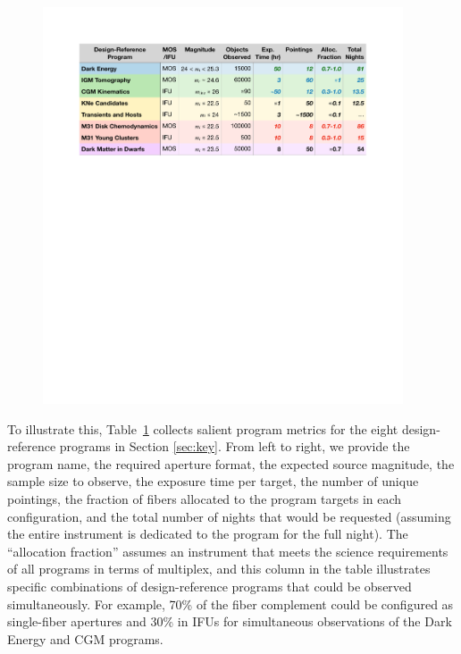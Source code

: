 \documentclass[11pt,a4paper,twoside,onecolumn,openany,final,oldfontcommands]{memoir}
\begin{document}
\begin{figure}[h!]
\centering
{}
\includegraphics[width=0.95\textwidth]{figs/key_program_summary_v2.pdf}
\label{tab:drprog}
\end{figure}

To illustrate this, Table~\ref{tab:drprog} collects salient program metrics for the eight design-reference programs in Section \ref{sec:key}.  From left to right, we provide the program name, the required aperture format, the expected source magnitude, the sample size to observe, the exposure time per target, the number of unique pointings, the fraction of fibers allocated to the program targets in each configuration, and the total number of nights that would be requested (assuming the entire instrument is dedicated to the program for the full night).  The ``allocation fraction'' assumes an instrument that meets the science requirements of all programs in terms of multiplex, and this column in the table illustrates specific combinations of design-reference programs that could be observed simultaneously.  For example, 70\% of the fiber complement could be configured as single-fiber apertures and 30\% in IFUs for simultaneous observations of the Dark Energy and CGM programs.
\end{document}
